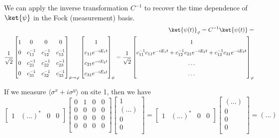 We can apply the inverse transformation $C^{-1}$ to recover the time dependence of $\ket{\psi}$ in the Fock (measurement) basis.
\begin{equation*}
    \begin{aligned}
    \ket{\psi(t)}_{\varphi} =
    C^{-1}\ket{\psi(t)}= \\
    \frac{1}{\sqrt{2}}
    \renewcommand*{\arraystretch}{1.5}
    \begin{bmatrix}
        1 & 0 & 0 & 0 \\
        0 & c^{-1}_{11} & c^{-1}_{12} & c^{-1}_{13} \\
        0 & c^{-1}_{21} & c^{-1}_{22} & c^{-1}_{23} \\
        0 & c^{-1}_{31} & c^{-1}_{32} & c^{-1}_{33} \\
    \end{bmatrix}_{\phi \rightarrow \varphi}
    \begin{bmatrix}
        1 \\
        c_{11} e^{-i E_1 t} \\
        c_{21} e^{-i E_2 t} \\
        c_{31} e^{-i E_3 t}\\
    \end{bmatrix}_{\phi}
    =
    \frac{1}{\sqrt{2}}
    \begin{bmatrix}
        1 \\
        c^{-1}_{11} c_{11} e^{-i E_1 t} +  c^{-1}_{12} c_{21} e^{-i E_2 t} + c^{-1}_{13} c_{31} e^{-i E_3 t} \\
        \ldots \\
        \ldots \\
    \end{bmatrix}_{\varphi}
\end{aligned}
\end{equation*}

If we measure $\langle \sigma^x + i \sigma^y \rangle$ on site 1, then we have
\begin{equation}
\begin{bmatrix}
1 & (\ldots)^* & 0 & 0
\end{bmatrix}
\begin{bmatrix}
0 & 1 & 0 & 0 \\
0 & 0 & 0 & 0 \\
0 & 0 & 0 & 0 \\
0 & 0 & 0 & 0 \\
\end{bmatrix}
\begin{bmatrix}
1 \\
(\ldots) \\
0 \\
0 \\
\end{bmatrix}
=
\begin{bmatrix}
1 & (\ldots)^* & 0 & 0
\end{bmatrix}
\begin{bmatrix}
(\ldots) \\
0 \\
0 \\
0 \\
\end{bmatrix}
= (...)
\end{equation}

